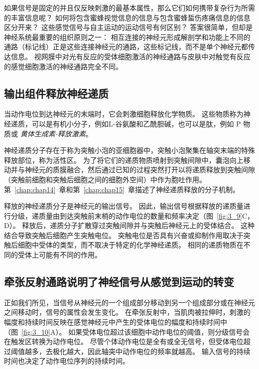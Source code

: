 如果信号是固定的并且仅反映刺激的最基本属性，那么它们如何携带复杂行为所需的丰富信息呢？
如何将包含蜜蜂视觉信息的信息与包含蜜蜂蜇伤疼痛信息的信息区分开来？
这些感觉信号与自主运动的运动信号有何区别？ 
答案很简单，但却是神经系统最重要的组织原则之一：
相互连接的神经元形成解剖学和功能上不同的通路（标记线）正是这些连接神经元的通路，这些标记线，而不是单个神经元都传达信息。 
视网膜中对光有反应的受体细胞激活的神经通路与皮肤中对触觉有反应的感觉细胞激活的神经通路完全不同。


\subsection{输出组件释放神经递质}

当动作电位到达神经元的末端时，它会刺激细胞释放化学物质。
这些物质称为神经递质，可以是有机小分子，例如L-谷氨酸和乙酰胆碱，也可以是肽，例如 P 物质或 \textit{黄体生成素-释放激素}。


神经递质分子存在于称为突触小泡的亚细胞器中，突触小泡聚集在轴突末端的特殊释放部位，称为活性区。
为了将它们的递质物质喷射到突触间隙中，囊泡向上移动并与神经元的质膜融合，然后通过已知的过程突然打开以将递质释放到突触间隙（突触前细胞和突触后细胞之间的细胞外空间）中作为胞吐作用。
第~\ref{chap:chap14}~章和第~\ref{chap:chap15}~章描述了神经递质释放的分子机制。


释放的神经递质分子是神经元的输出信号。 
因此，输出信号根据释放的递质量进行分级，递质量由到达突触前末梢的动作电位的数量和频率决定（图~\ref{fig:3_9}C，D）。
释放后，递质分子扩散穿过突触间隙并与突触后神经元上的受体结合。
这种结合导致突触后细胞产生突触电位。
突触电位是否具有兴奋或抑制作用取决于突触后细胞中受体的类型，而不取决于特定的化学神经递质。
相同的递质物质在不同的受体上可能有不同的作用。



\subsection{牵张反射通路说明了神经信号从感觉到运动的转变}

正如我们所见，当信号从神经元的一个组成部分移动到另一个组成部分或在神经元之间移动时，信号的属性会发生变化。 
在牵张反射中，当肌肉被拉伸时，刺激的幅度和持续时间反映在感觉神经元中产生的受体电位的幅度和持续时间中（图~\ref{fig:3_10}A）。
如果受体电位超过该细胞中动作电位的阈值，则分级信号会在触发区转换为动作电位。
尽管个体动作电位是全有或全无信号，但受体电位超过阈值越多，去极化越大，因此轴突中动作电位的频率就越高。
输入信号的持续时间也决定了动作电位序列的持续时间。


